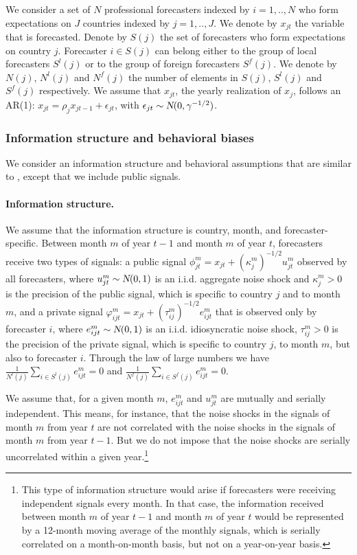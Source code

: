 

We consider a set of $N$ professional forecasters indexed by $i=1,..,N$ who form expectations on $J$ countries indexed by $j=1,..,J$. We denote by $x_{jt}$ the variable that is forecasted. Denote by $\textit{S}(j)$ the set of forecasters who form expectations on country $j$. Forecaster $i\in\textit{S}(j)$ can belong either to the group of local forecasters $\textit{S}^l(j)$ or to the group of foreign forecasters $\textit{S}^f(j)$. We denote by $N(j)$, $N^l(j)$ and $N^f(j)$ the number of elements in $\textit{S}(j)$, $\textit{S}^l(j)$ and $\textit{S}^f(j)$ respectively. We assume that $x_{jt}$, the yearly realization of $x_j$, follows an AR(1):
$x_{jt}=\rho_jx_{jt-1}+\epsilon_{jt}\label{eq:ar1}$, 
with $\epsilon_{jt}\sim\textsl{N}(0,\gamma^{-1/2})$.

\subsubsection{Information structure and behavioral biases}

We consider an information structure and behavioral assumptions that are similar to \citet{Angeletosetal2020}, except that we include public signals.

\paragraph{Information structure.}

We assume that the information structure is country, month, and forecaster-specific. Between month $m$ of year $t-1$ and month $m$ of year $t$, forecasters receive two types of signals: a public signal
$\phi_{jt}^m=x_{jt}+(\kappa_{j}^m)^{-1/2}u_{jt}^m$
observed by all forecasters, where $u_{jt}^m\sim\textsl{N}(0,1)$ is an i.i.d. aggregate noise shock and $\kappa_{j}^m>0$ is the precision of the public signal, which is specific to country $j$ and to month $m$, and a private signal
$\varphi_{ijt}^m=x_{jt}+(\tau_{ij}^m)^{-1/2}e_{ijt}^m$
that is observed only by forecaster $i$, where $e_{ijt}^m\sim\textsl{N}(0,1)$ is an i.i.d. idiosyncratic noise shock, $\tau_{ij}^m>0$ is the precision of the private signal, which is specific to country $j$, to month $m$, but also to forecaster $i$. Through the law of large numbers we have $\frac{1}{N^l(j)}\sum_{i\in\textit{S}^l(j)}e_{ijt}^m=0$ and $\frac{1}{N^f(j)}\sum_{i\in\textit{S}^f(j)}e_{ijt}^m=0$.

We assume that, for a given month $m$, $e_{ijt}^m$ and $u_{jt}^m$ are mutually and serially independent. This means, for instance, that the noise shocks in the signals of month $m$ from year $t$ are not correlated with the noise shocks in the signals of month $m$ from year $t-1$. But we do not impose that the noise shocks are serially uncorrelated within a given year.\footnote{This type of information structure would arise if forecasters were receiving independent signals every month. In that case, the information received between month $m$ of year $t-1$ and month $m$ of year $t$ would be represented by a 12-month moving average of the monthly signals, which is serially correlated on a month-on-month basis, but not on a year-on-year basis.}

